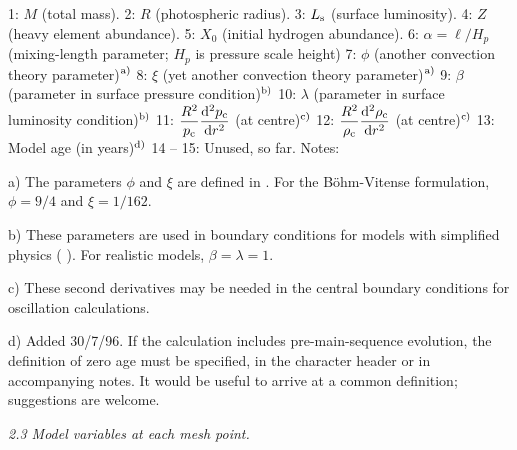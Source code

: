 \medskip
{\obeylines
 1: $M$  	(total mass).
 2: $R$  	(photospheric radius).
 3: $L_{\rm s}$	(surface luminosity).
 4: $Z$ 	(heavy element abundance).
 5: $X_0$ 	(initial hydrogen abundance).
 6: $\alpha = \ell /H_p$ (mixing-length parameter; %
 $H_p$ is pressure scale height)
 7: $\phi$  	(another convection theory parameter)$^{\rm a)}$
 8: $\xi$  	(yet another convection theory parameter)$^{\rm a)}$
 9: $\beta$	(parameter in surface pressure condition)$^{\rm b)}$
10: $\lambda$	(parameter in surface luminosity condition)$^{\rm b)}$
11: $\displaystyle{{R^2 \over p_{\rm c}} {{\rm d}^2 p_{\rm c}  \over {\rm d}r^2}}$ %
(at centre)$^{\rm c)}$
12: $\displaystyle{{R^2 \over \rho_{\rm c}} %
{\dd^2 \rho_{\rm c} \over \dd r^2}}$ (at centre)$^{\rm c)}$
13: Model age (in years)$^{\rm d)}$
14 -- 15: Unused, so far.
}
\medskip\noindent
Notes:
\medskip
\item{a)}
The parameters $\phi$ and $\xi$ are defined in {\CP}.
For the B\"ohm-Vitense formulation, $\phi = 9/4$ and $\xi = 1/162$.
\item{b)} 
These parameters are used in boundary conditions for
models with simplified physics ({\cf} {\CP}).
For realistic models, $\beta = \lambda = 1$.
\item{c)}
These second derivatives may be needed
in the central boundary conditions for oscillation calculations.
\item{d)}
Added 30/7/96.
If the calculation includes pre-main-sequence evolution, the definition
of zero age must be specified, in the character header or in
accompanying notes.
It would be useful to arrive at a common definition;
suggestions are welcome.

\subsect
{\it 2.3 Model variables at each mesh point.}

